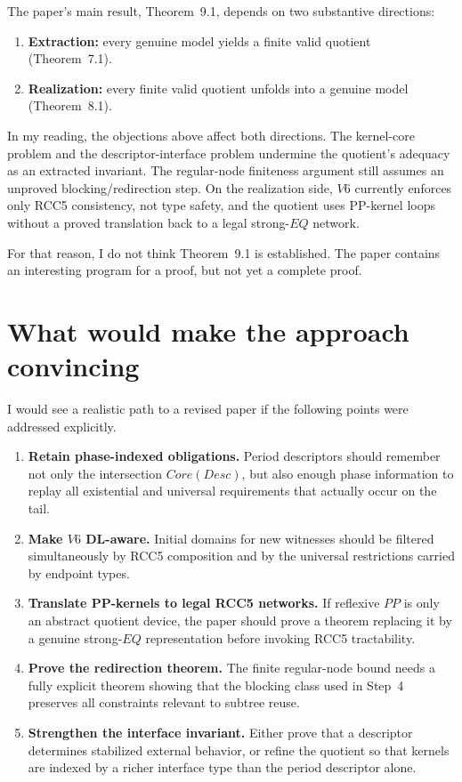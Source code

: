 \documentclass[11pt]{article}
\begin{document}
The paper's main result, Theorem~9.1, depends on two substantive directions:
\begin{enumerate}
  \item \textbf{Extraction:} every genuine model yields a finite valid quotient (Theorem~7.1).
  \item \textbf{Realization:} every finite valid quotient unfolds into a genuine model (Theorem~8.1).
\end{enumerate}

In my reading, the objections above affect both directions. The kernel-core problem and the descriptor-interface problem undermine the quotient's adequacy as an extracted invariant. The regular-node finiteness argument still assumes an unproved blocking/redirection step. On the realization side, $V6$ currently enforces only RCC5 consistency, not type safety, and the quotient uses PP-kernel loops without a proved translation back to a legal strong-$EQ$ network.

For that reason, I do not think Theorem~9.1 is established. The paper contains an interesting program for a proof, but not yet a complete proof.

\section{What would make the approach convincing}

I would see a realistic path to a revised paper if the following points were addressed explicitly.

\begin{enumerate}
  \item \textbf{Retain phase-indexed obligations.} Period descriptors should remember not only the intersection $Core(Desc)$, but also enough phase information to replay all existential and universal requirements that actually occur on the tail.
  \item \textbf{Make $V6$ DL-aware.} Initial domains for new witnesses should be filtered simultaneously by RCC5 composition and by the universal restrictions carried by endpoint types.
  \item \textbf{Translate PP-kernels to legal RCC5 networks.} If reflexive $PP$ is only an abstract quotient device, the paper should prove a theorem replacing it by a genuine strong-$EQ$ representation before invoking RCC5 tractability.
  \item \textbf{Prove the redirection theorem.} The finite regular-node bound needs a fully explicit theorem showing that the blocking class used in Step~4 preserves all constraints relevant to subtree reuse.
  \item \textbf{Strengthen the interface invariant.} Either prove that a descriptor determines stabilized external behavior, or refine the quotient so that kernels are indexed by a richer interface type than the period descriptor alone.
\end{enumerate}
\end{document}
